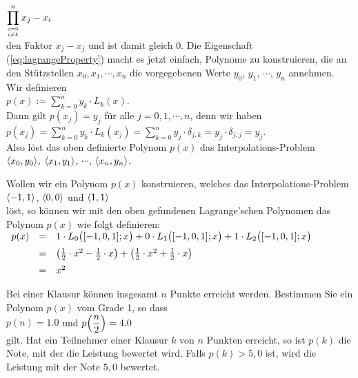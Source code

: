 $\displaystyle\prod\limits_{i=0 \atop i\not=k}^n x_j - x_i$
\\[0.2cm]
den Faktor $x_j - x_j$ und ist damit gleich $0$.
Die Eigenschaft (\ref{eq:lagrangeProperty}) macht es jetzt einfach, Polynome zu
konstruieren, die an den  St\"utzstellen $x_0,x_1,\cdots,x_n$ die vorgegebenen Werte 
$y_0$, $y_1$, $\cdots$, $y_n$ annehmen. Wir definieren 
\\[0.3cm]
\hspace*{1.3cm}
$\displaystyle p(x) := \sum\limits_{k=0}^n y_k \cdot  L_k(x)$.
\\[0.3cm]
Dann gilt $p(x_j) = y_j$ f\"ur alle $j=0,1,\cdots,n$, denn wir haben
\\[0.2cm]
\hspace*{1.3cm}
$\displaystyle p(x_j) = \sum\limits_{k=0}^n y_k \cdot  L_k(x_j) = \sum\limits_{k=0}^n y_j \cdot  \delta_{j,k} = y_j \cdot \delta_{j,j} = y_j$. 
\\[0.2cm] 
Also l\"ost das oben definierte Polynom $p(x)$ das Interpolations-Problem 
\\[0.2cm]
\hspace*{1.3cm}
$\pair(x_0, y_0)$, $\pair(x_1, y_1)$, $\cdots$, $\pair(x_n, y_n)$.


\example
Wollen wir ein Polynom $p(x)$ konstruieren, welches das Interpolations-Problem
\\[0.2cm]
\hspace*{1.3cm}
$\pair(-1,1)$, $\pair(0,0)$ und $\pair(1,1)$
\\[0.2cm]
l\"ost, so k\"onnen wir mit den oben gefundenen Lagrange'schen Polynomen das Polynom $p(x)$ wie folgt
definieren: 
\\[0.2cm]
\hspace*{1.3cm}
$
\begin{array}[t]{lcl}
  p(x) & = & 1 \cdot  L_0\bigl([-1,0,1];x\bigr) + 0 \cdot  L_1\bigl([-1,0,1];x\bigr) + 1\cdot L_2\bigl([-1,0,1];x\bigr) \\[0.2cm]
       & = & \bigl(\frac{1}{2}\cdot x^2 - \frac{1}{2}\cdot x\bigr) + \bigl(\frac{1}{2}\cdot x^2 + 
             \frac{1}{2}\cdot x\bigr)  \\[0.2cm]
       & = & x^2
\end{array}
$
\vspace*{0.3cm}


\exercise
Bei einer Klausur k\"onnen insgesamt $n$ Punkte erreicht werden. Bestimmen
Sie ein Polynom $p(x)$ vom Grade 1, so dass
\\[0.2cm]
\hspace*{1.3cm} $p(n) = 1.0$ \quad und \quad $\displaystyle p\Bigl(\frac{n}{2}\Bigr) = 4.0$
\\[0.2cm]
gilt.  Hat ein Teilnehmer einer Klausur $k$ von $n$ Punkten erreicht, so ist $p(k)$ die
Note, mit der die Leistung bewertet wird.  Falls $p(k) > 5,0$ ist, wird die Leistung mit der Note
$5,0$ bewertet.
\eox

